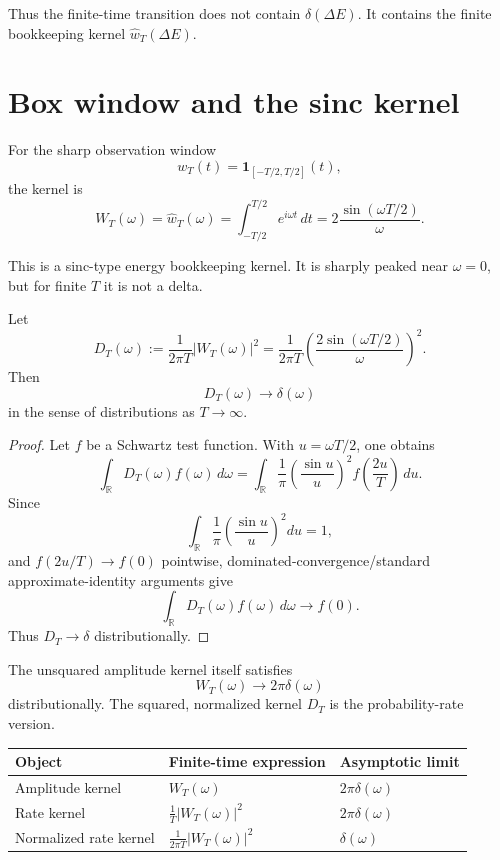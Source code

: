 \documentclass[11pt]{article}
\begin{document}
Thus the finite-time transition does not contain \(\delta(\Delta E)\).  It contains the finite bookkeeping kernel \(\widehat w_T(\Delta E)\).

\section{Box window and the sinc kernel}

For the sharp observation window
\[
w_T(t)=\mathbf 1_{[-T/2,T/2]}(t),
\]
the kernel is
\[
W_T(\omega)=\widehat w_T(\omega)
=
\int_{-T/2}^{T/2}e^{i\omega t}\,dt
=
2\frac{\sin(\omega T/2)}{\omega}.
\]

This is a sinc-type energy bookkeeping kernel.  It is sharply peaked near \(\omega=0\), but for finite \(T\) it is not a delta.

\begin{theorem}
Let
\[
D_T(\omega):=\frac{1}{2\pi T}|W_T(\omega)|^2
=
\frac{1}{2\pi T}\left(\frac{2\sin(\omega T/2)}{\omega}\right)^2.
\]
Then
\[
D_T(\omega)\to \delta(\omega)
\]
in the sense of distributions as \(T\to\infty\).
\end{theorem}

\begin{proof}
Let \(f\) be a Schwartz test function.  With \(u=\omega T/2\), one obtains
\[
\int_{\mathbb R}D_T(\omega)f(\omega)\,d\omega
=
\int_{\mathbb R}\frac{1}{\pi}\left(\frac{\sin u}{u}\right)^2
f\!\left(\frac{2u}{T}\right)\,du.
\]
Since
\[
\int_{\mathbb R}\frac{1}{\pi}\left(\frac{\sin u}{u}\right)^2du=1,
\]
and \(f(2u/T)\to f(0)\) pointwise, dominated-convergence/standard approximate-identity arguments give
\[
\int_{\mathbb R}D_T(\omega)f(\omega)\,d\omega\to f(0).
\]
Thus \(D_T\to\delta\) distributionally.
\end{proof}

The unsquared amplitude kernel itself satisfies
\[
W_T(\omega)\to 2\pi\delta(\omega)
\]
distributionally.  The squared, normalized kernel \(D_T\) is the probability-rate version.


\begin{center}
\begin{tabular}{lll}
\hline
Object & Finite-time expression & Asymptotic limit \\
\hline
Amplitude kernel & \(W_T(\omega)\) & \(2\pi\delta(\omega)\) \\
Rate kernel & \(\frac{1}{T}|W_T(\omega)|^2\) & \(2\pi\delta(\omega)\) \\
Normalized rate kernel & \(\frac{1}{2\pi T}|W_T(\omega)|^2\) & \(\delta(\omega)\) \\
\hline
\end{tabular}
\end{center}
\end{document}
